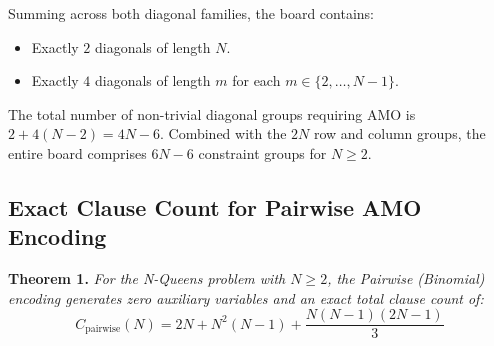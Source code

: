Summing across both diagonal families, the board contains:
\begin{itemize}
    \item Exactly $2$ diagonals of length $N$.
    \item Exactly $4$ diagonals of length $m$ for each $m \in \{2, \dots, N-1\}$.
\end{itemize}
The total number of non-trivial diagonal groups requiring AMO is $2 + 4(N-2) = 4N - 6$. Combined with the $2N$ row and column groups, the entire board comprises $6N - 6$ constraint groups for $N \ge 2$.

\subsection{Exact Clause Count for Pairwise AMO Encoding}
\label{subsec:proof_pairwise}

\textbf{Theorem 1.} \textit{For the N-Queens problem with $N \ge 2$, the Pairwise (Binomial) encoding generates zero auxiliary variables and an exact total clause count of:}
\begin{equation}
C_{\text{pairwise}}(N) = 2N + N^2(N-1) + \frac{N(N-1)(2N-1)}{3}
\end{equation}

